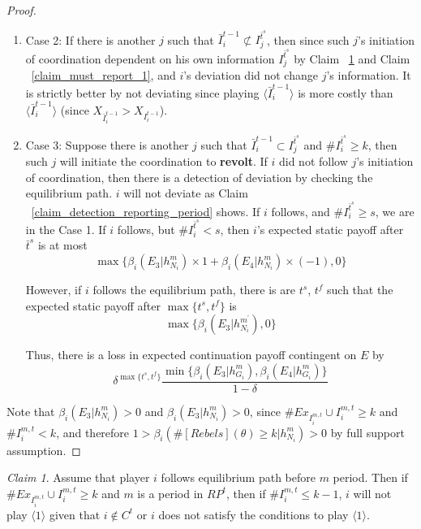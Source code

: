 \documentclass[12pt,letter]{article}
\theoremstyle{definition}
\theoremstyle{remark}
\theoremstyle{claim}
\newtheorem{claim}{Claim}
\begin{document}
\begin{proof}
\begin{enumerate}
\item Case 2: If there is another $j$ such that $\bar{I}^{t-1}_i\not\subset I^{\bar{t}^{s}}_j$, then since such $j$'s initiation of coordination dependent on his own information $I^{\bar{t}^{s}}_j$ by Claim ~\ref{claim_can_not_pretend_almost_success} and Claim ~\ref{claim_must_report_1}, and $i$'s deviation did not change $j$'s information. It is strictly better by not deviating since playing $\langle\bar{I}^{t-1}_i\rangle$ is more costly than $\langle\bar{I}^{t-1}_i\rangle$ (since $X_{\bar{I}^{t-1}_i}>X_{I^{t-1}_i}$).

\item Case 3: Suppose there is another $j$ such that $\bar{I}^{t-1}_i\subset {I}^{\bar{t}^{s}}_j$ and $\# I^{\bar{t}^s}_i\geq k$, then such $j$ will initiate  the coordination to \textbf{revolt}. If $i$ did not follow $j$'s initiation of coordination, then there is a detection of deviation by checking the equilibrium path. $i$ will not deviate as Claim ~\ref{claim_detection_reporting_period} shows. If $i$ follows, and $\#I^{\bar{t}^s}_i\geq s$, we are in the Case 1. If $i$ follows, but $\#I^{\bar{t}^s}_i< s$, then $i$'s expected static payoff after $\bar{t}^{s}$ is at most
\[
{\max\{\beta_{i}(E_3|h^{m}_{N_i})\times 1+\beta_{i}(E_4|h^{m}_{N_i})\times (-1), 0\}}
\]

However, if $i$ follows the equilibrium path, there is are $t^s$, $t^f$ such that the expected static payoff after $\max\{t^s,t^f\}$ is
\[\max\{\beta_{i}(E_3|h^{m^{'}}_{N_i}),0\}\]

Thus, there is a loss in expected continuation payoff contingent on $E$ by
\[\delta^{\max\{t^s,t^f\}}\frac{\min\{\beta_{i}(E_3|h^{m}_{G_i}),\beta_{i}(E_4|h^{m}_{G_i})\}}{1-\delta}\]
\end{enumerate}

Note that $\beta_{i}(E_3|h^{m}_{N_i})>0$ and $\beta_{i}(E_3|h^{m}_{N_i})>0$, since $\#Ex_{I^{m,t}_i}\cup I^{m,t}_i\geq k$ and $\# I^{m,t}_i<k$, and therefore $1>\beta_{i}(\#[Rebels](\theta)\geq k|h^{m}_{N_i})>0$ by full support assumption.
\end{proof}



\begin{claim} 
\label{claim_can_not_pretend_almost_success}
Assume that player $i$ follows equilibrium path before $m$ period. Then if $\#Ex_{I^{m,t}_i}\cup I^{m,t}_i\geq k$ and $m$ is a period in $RP^t$, then if $\#I^{m,t}_i\leq k-1$, $i$ will not play $\langle 1 \rangle$ given that $i\notin C^t$ or $i$ does not satisfy the conditions to play $\langle 1 \rangle$.
\end{claim}
\end{document}
